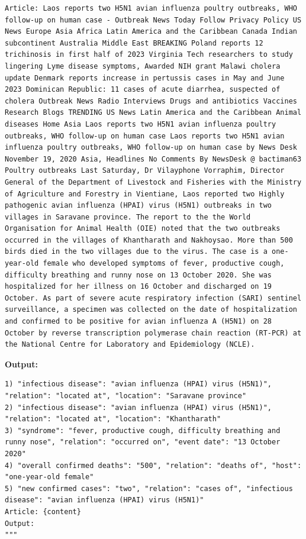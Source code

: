 \documentclass[letterpaper]{article} %
\begin{document}
\begin{lstlisting}
Article: Laos reports two H5N1 avian influenza poultry outbreaks, WHO follow-up on human case - Outbreak News Today Follow Privacy Policy US News Europe Asia Africa Latin America and the Caribbean Canada Indian subcontinent Australia Middle East BREAKING Poland reports 12 trichinosis in first half of 2023 Virginia Tech researchers to study lingering Lyme disease symptoms, Awarded NIH grant Malawi cholera update Denmark reports increase in pertussis cases in May and June 2023 Dominican Republic: 11 cases of acute diarrhea, suspected of cholera Outbreak News Radio Interviews Drugs and antibiotics Vaccines Research Blogs TRENDING US News Latin America and the Caribbean Animal diseases Home Asia Laos reports two H5N1 avian influenza poultry outbreaks, WHO follow-up on human case Laos reports two H5N1 avian influenza poultry outbreaks, WHO follow-up on human case by News Desk November 19, 2020 Asia, Headlines No Comments By NewsDesk @ bactiman63 Poultry outbreaks Last Saturday, Dr Vilayphone Vorraphim, Director General of the Department of Livestock and Fisheries with the Ministry of Agriculture and Forestry in Vientiane, Laos reported two Highly pathogenic avian influenza (HPAI) virus (H5N1) outbreaks in two villages in Saravane province. The report to the the World Organisation for Animal Health (OIE) noted that the two outbreaks occurred in the villages of Khantharath and Nakhoysao. More than 500 birds died in the two villages due to the virus. The case is a one-year-old female who developed symptoms of fever, productive cough, difficulty breathing and runny nose on 13 October 2020. She was hospitalized for her illness on 16 October and discharged on 19 October. As part of severe acute respiratory infection (SARI) sentinel surveillance, a specimen was collected on the date of hospitalization and confirmed to be positive for avian influenza A (H5N1) on 28 October by reverse transcription polymerase chain reaction (RT-PCR) at the National Centre for Laboratory and Epidemiology (NCLE).
\end{lstlisting}
            

\textbf{Output:}
\begin{lstlisting}
1) "infectious disease": "avian influenza (HPAI) virus (H5N1)", "relation": "located at", "location": "Saravane province"
2) "infectious disease": "avian influenza (HPAI) virus (H5N1)", "relation": "located at", "location": "Khantharath"
3) "syndrome": "fever, productive cough, difficulty breathing and runny nose", "relation": "occurred on", "event date": "13 October 2020"
4) "overall confirmed deaths": "500", "relation": "deaths of", "host": "one-year-old female"
5) "new confirmed cases": "two", "relation": "cases of", "infectious disease": "avian influenza (HPAI) virus (H5N1)"
Article: {content}
Output:
"""
\end{lstlisting}
\end{document}
